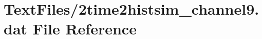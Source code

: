 \hypertarget{2time2histsim__channel9_8dat}{}\section{Text\+Files/2time2histsim\+\_\+channel9.dat File Reference}
\label{2time2histsim__channel9_8dat}
